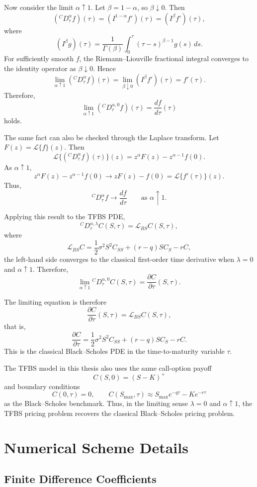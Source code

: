 \documentclass[11pt,a4paper]{report}
\begin{document}
Now consider the limit $\alpha \uparrow 1$. Let $\beta=1-\alpha$, so $\beta\downarrow0$. Then
\[
({}^C D_\tau^\alpha f)(\tau)
=
(I^{1-\alpha}f')(\tau)
=
(I^\beta f')(\tau),
\]
where
\[
(I^\beta g)(\tau)
=
\frac{1}{\Gamma(\beta)}
\int_0^\tau
(\tau-s)^{\beta-1}g(s)\,ds.
\]
For sufficiently smooth $f$, the Riemann--Liouville fractional integral converges to the identity operator as $\beta\downarrow0$. Hence
\[
\lim_{\alpha\uparrow1}
({}^C D_\tau^\alpha f)(\tau)
=
\lim_{\beta\downarrow0}
(I^\beta f')(\tau)
=
f'(\tau).
\]
Therefore,
\[
\boxed{
\lim_{\alpha\uparrow1}
({}^C D_\tau^{\alpha,0} f)(\tau)
=
\frac{df}{d\tau}(\tau)
}
\]
holds.

The same fact can also be checked through the Laplace transform. Let $F(z)=\mathcal{L}\{f\}(z)$. Then
\[
\mathcal{L}\{({}^C D_\tau^\alpha f)(\tau)\}(z)
=
z^\alpha F(z)-z^{\alpha-1}f(0).
\]
As $\alpha\uparrow1$,
\[
z^\alpha F(z)-z^{\alpha-1}f(0)
\longrightarrow
zF(z)-f(0)
=
\mathcal{L}\{f'(\tau)\}(z).
\]
Thus,
\[
{}^C D_\tau^\alpha f
\longrightarrow
\frac{df}{d\tau}
\qquad
\text{as } \alpha\uparrow1.
\]

Applying this result to the TFBS PDE,
\[
{}^C D_\tau^{\alpha,\lambda} C(S,\tau)
=
\mathcal{L}_{BS}C(S,\tau),
\]
where
\[
\mathcal{L}_{BS}C
=
\frac{1}{2}\sigma^2S^2C_{SS}
+
(r-q)SC_S
-
rC,
\]
the left-hand side converges to the classical first-order time derivative when $\lambda=0$ and $\alpha\uparrow1$. Therefore,
\[
\lim_{\alpha\uparrow1}
{}^C D_\tau^{\alpha,0} C(S,\tau)
=
\frac{\partial C}{\partial \tau}(S,\tau).
\]

The limiting equation is therefore
\[
\frac{\partial C}{\partial \tau}(S,\tau)
=
\mathcal{L}_{BS}C(S,\tau),
\]
that is,
\[
\frac{\partial C}{\partial \tau}
=
\frac{1}{2}\sigma^2S^2C_{SS}
+
(r-q)SC_S
-
rC.
\]
This is the classical Black--Scholes PDE in the time-to-maturity variable $\tau$.

The TFBS model in this thesis also uses the same call-option payoff
\[
C(S,0)=(S-K)^+
\]
and boundary conditions
\[
C(0,\tau)=0,
\qquad
C(S_{\max},\tau)
\approx
S_{\max}e^{-q\tau}-Ke^{-r\tau}
\]
as the Black--Scholes benchmark. Thus, in the limiting sense $\lambda=0$ and $\alpha\uparrow1$, the TFBS pricing problem recovers the classical Black--Scholes pricing problem.

\chapter{Numerical Scheme Details}

\section{Finite Difference Coefficients}
\end{document}

